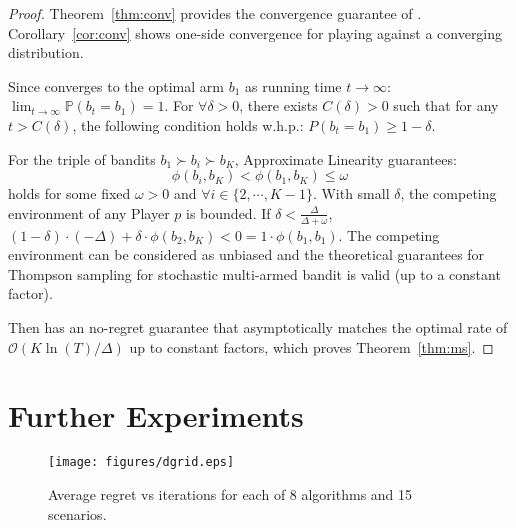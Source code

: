 \begin{proof}
Theorem~\ref{thm:conv} provides the convergence guarantee of \multisparring. Corollary~\ref{cor:conv} shows one-side convergence for playing against a converging distribution.

Since \multisparring converges to the optimal arm $b_1$ as running time $t\rightarrow \infty$: $\lim_{t\rightarrow \infty} \mathbb{P}(b_t = b_1) = 1$. For $\forall \delta>0$, there exists $C(\delta) > 0$ such that for any $t > C(\delta)$, the following condition holds w.h.p.:
$P(b_t = b_1) \ge 1-\delta$.

For the triple of bandits $b_1 \succ b_i \succ b_K$, Approximate Linearity guarantees:
$$\phi(b_i,b_K) < \phi(b_1,b_K) \leq \omega$$
holds for some fixed $\omega > 0$ and $\forall i \in \{2, \cdots, K-1\}$. With small $\delta$, the competing environment of any Player $p$ is bounded. If $\delta < \frac{\Delta}{\Delta + \omega}$,  $(1-\delta)\cdot(-\Delta) + \delta \cdot  \phi(b_2,b_K) < 0 = 1\cdot \phi(b_1,b_1)$. The competing environment can be considered as unbiased and the theoretical guarantees for Thompson sampling for stochastic multi-armed bandit is valid (up to a constant factor).

Then \multisparring has an no-regret guarantee that asymptotically matches the optimal rate of $\mathcal{O}(K\ln(T)/\Delta)$ up to constant factors, which proves Theorem~\ref{thm:ms}.

\end{proof}

\section{Further Experiments}
\label{app:exp}

\begin{figure*}[t]
\centering
\texttt{[image: figures/dgrid.eps]}
\vspace{-0.1in}
\caption{Average regret vs iterations for each of 8 algorithms and 15 scenarios.}
\label{fig:grid}
\end{figure*}


